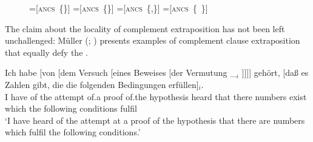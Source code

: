 \documentclass[output=paper
,notxmath 
 	        ,biblatex
                ,babelshorthands
                ,newtxmath
                ,draftmode
                ,colorlinks, citecolor=brown
]{langscibook}
\begin{document}
\begin{figure}
  
  { \newbox\onebox \newbox\twobox \newbox\onetwobox \newbox\emptybox

    \setbox\onebox=\hbox{[\textsc{ancs} \{\}]}
    \setbox\twobox=\hbox{[\textsc{ancs} \{\}]}
    \setbox\onetwobox=\hbox{[\textsc{ancs} \{,\}]}
    \setbox\emptybox=\hbox{[\textsc{ancs} \{ \}]}
}

\end{figure}

The claim about the locality of complement extraposition has not been
left unchallenged: Müller (\citeyear[]{Mueller99a};
\citeyear[]{Mueller2004d}) presents examples of complement
clause extraposition that equally defy the .

\ea
\label{ex-versuch-eines-beweises-der-vermutung} 
{\gll Ich habe [von [dem Versuch [eines Beweises [der Vermutung \_$_i$ ]]]] gehört, [daß es Zahlen gibt, die die folgenden Bedingungen erfüllen]$_i$.\footnotemark\\
      I have \spacebr{}of \spacebr{}the attempt \spacebr{}of.a proof \spacebr{}of.the hypothesis {} {}
      heard \spacebr{}that there numbers exist which the following conditions
      fulfil\\
      \glt `I have heard of the attempt at a proof of the hypothesis
      that there are numbers which fulfil the following conditions.'
    }  
    
\end{document}
